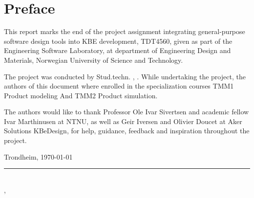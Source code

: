 \section*{Preface}
This report marks the end of the project assignment integrating general-purpose software design tools into KBE development, TDT4560, given as part of the Engineering Software Laboratory, at department of Engineering Design and Materials, Norwegian University of Science and Technology.

The project was conducted by Stud.techn. \myauthorA, \myauthorB. While undertaking the project, the authors of this document where enrolled in the specialization courses TMM1 Product modeling And TMM2 Product simulation.

The authors would like to thank Professor Ole Ivar Sivertsen and academic fellow Ivar Marthinusen at NTNU, as well as Geir Iversen and Olivier Doucet at Aker Solutions KBeDesign, for help, guidance, feedback and inspiration throughout the project.


Trondheim, \today


\rule{10cm}{0.5pt}\\
\indent \myauthorA, \myauthorB \\
